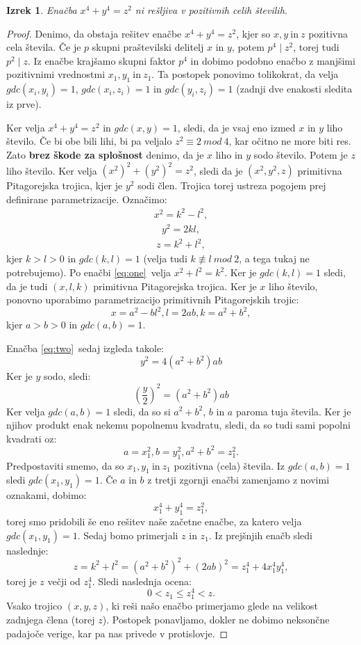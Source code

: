 \documentclass[a4paper, 10pt]{article}
\newtheorem{izr}{Izrek}
\begin{document}
\begin{izr}
\label{izr:fer}
Enačba $x^4 + y^4 = z^2$ ni rešljiva v pozitivnih celih številih.
\end{izr}

\begin{proof}
Denimo, da obstaja rešitev enačbe $x^4 + y^4 = z^2$, kjer so $x, y~\text{in}~z$ pozitivna cela števila.
Če je $p$ skupni praštevilski delitelj $x$ in $y$, potem $p^4 \mid z^2$, torej tudi $p^2 \mid z$. Iz enačbe krajšamo skupni faktor $p^4$ in dobimo podobno enačbo z manjšimi pozitivnimi vrednostmi $x_1, y_1~\text{in}~z_1$. Ta postopek ponovimo tolikokrat, da velja $gdc(x_i,y_i)=1$, $gdc(x_i,z_i)=1$ in $gdc(y_i,z_i)=1$ (zadnji dve enakosti sledita iz prve).

Ker velja $x^4 + y^4 = z^2$ in $gdc(x,y)=1$, sledi, da je vsaj eno izmed $x$ in $y$ liho število. Če bi obe bili lihi, bi pa veljalo $z^2 \equiv 2~mod~4$, kar očitno ne more biti res. Zato \textbf{brez škode za splošnost} denimo, da je $x$ liho in $y$ sodo število. Potem je $z$ liho število. Ker velja $(x^2)^2 + (y^2)^2 = z^2$, sledi da je $(x^2, y^2, z)$ primitivna Pitagorejska trojica, kjer je $y^2$ sodi člen. Trojica torej ustreza pogojem prej definirane parametrizacije.
Označimo:
\begin{align}
\label{eq:one}
x^2 = k^2 - l^2, 
\end{align}
\begin{align}
\label{eq:two}
y^2=2kl,
\end{align}
\begin{align}
\label{eq:three}
 z = k^2 + l^2,
\end{align}
kjer $k > l > 0$ in $gdc(k, l) = 1$ (velja tudi $k \not\equiv l~mod~2$, a tega tukaj ne potrebujemo). Po enačbi \ref{eq:one}~velja $x^2 + l^2 = k^2$. Ker je $gdc(k, l) = 1$ sledi, da je tudi $(x, l, k)$ primitivna Pitagorejska trojica. Ker je $x$ liho število, ponovno uporabimo parametrizacijo primitivnih Pitagorejskih trojic:
\[
x = a^2 - bl^2, l=2ab, k = a^2 + b^2,
\] 
kjer $a > b > 0$ in $gdc(a, b) = 1$.

Enačba \ref{eq:two}~sedaj izgleda takole:
\[
y^2 = 4(a^2 + b^2)ab
\]
Ker je $y$ sodo, sledi:
\[
(\frac{y}{2})^2 = (a^2 + b^2)ab
\]
Ker velja $gdc(a, b) = 1$ sledi, da so si $a^2 + b^2$, $b$ in $a$ paroma tuja števila. Ker je njihov produkt enak nekemu popolnemu kvadratu, sledi, da so tudi sami popolni kvadrati oz:
\[
a = x_1^2, b = y_1^2, a^2 + b^2 = z_1^2.
\]
Predpostaviti smemo, da so $x_1, y_1~\text{in}~z_1$ pozitivna (cela) števila. Iz $gdc(a, b) = 1$ sledi $gdc(x_1, y_1) = 1$. Če $a$ in $b$ z tretji zgornji enačbi zamenjamo z novimi oznakami, dobimo:
\[
x_1^4 + y_1^4 = z_1^2,
\]
torej smo pridobili še eno rešitev naše začetne enačbe, za katero velja $gdc(x_1, y_1) = 1$. Sedaj bomo primerjali $z$ in $z_1$. Iz prejšnjih enačb sledi naslednje:
\[
z = k^2 + l^2 = (a^2 + b^2)^2 + (2ab)^2 = z_1^4 + 4x_1^4y_1^4,
\]
torej je $z$ večji od $z_1^4$.
Sledi naslednja ocena:
\[
0 < z_1 \leq z_1^4 < z.
\]
Vsako trojico $(x, y, z)$, ki reši našo enačbo primerjamo glede na velikost zadnjega člena (torej $z$). Postopek ponavljamo, dokler ne dobimo neksončne padajoče verige, kar pa nas privede v protislovje.
\end{proof}
\end{document}
